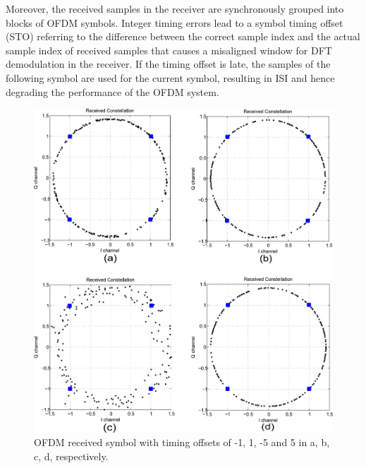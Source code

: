 Moreover, the received samples in the receiver are synchronously grouped into blocks of OFDM symbols.
Integer timing errors lead to a symbol timing offset (STO) referring to the difference between the correct sample index and the actual sample index of received samples that causes a misaligned window for DFT demodulation in the receiver.
If the timing offset is late, the samples of the following symbol are used for the current symbol, resulting in ISI and hence degrading the performance of the OFDM system.
\begin{figure}
	\centerline{\includegraphics [width=0.8\columnwidth] {Figures/timeoff.pdf} }
	\caption{OFDM received symbol with timing offsets of -1, 1, -5 and 5 in a, b, c, d, respectively.}
	\label{fig:Timingoffsetconstellation}
\end{figure}

